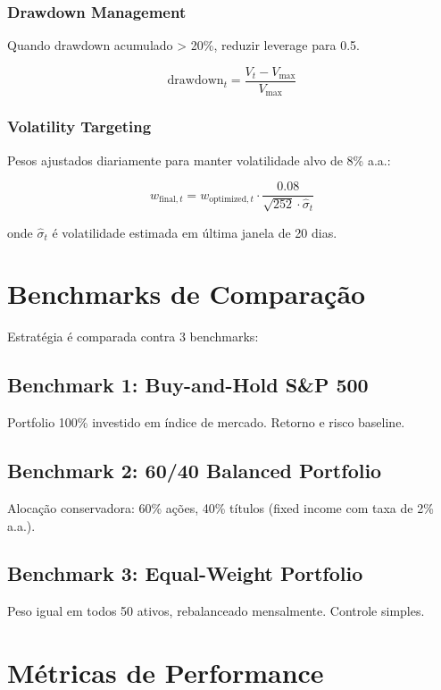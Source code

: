 \documentclass[12pt,a4paper]{article}
\begin{document}
\subsubsection{Drawdown Management}

Quando drawdown acumulado > 20\%, reduzir leverage para 0.5.

\[
\text{drawdown}_t = \frac{V_t - V_{\max}}{V_{\max}}
\]

\subsubsection{Volatility Targeting}

Pesos ajustados diariamente para manter volatilidade alvo de 8\% a.a.:

\[
w_{\text{final}, t} = w_{\text{optimized}, t} \cdot \frac{0.08}{\sqrt{252} \cdot \hat{\sigma}_t}
\]

onde $\hat{\sigma}_t$ é volatilidade estimada em última janela de 20 dias.

\section{Benchmarks de Comparação}

Estratégia é comparada contra 3 benchmarks:

\subsection{Benchmark 1: Buy-and-Hold S\&P 500}

Portfolio 100\% investido em índice de mercado. Retorno e risco baseline.

\subsection{Benchmark 2: 60/40 Balanced Portfolio}

Alocação conservadora: 60\% ações, 40\% títulos (fixed income com taxa de 2\% a.a.).

\subsection{Benchmark 3: Equal-Weight Portfolio}

Peso igual em todos 50 ativos, rebalanceado mensalmente. Controle simples.

\section{Métricas de Performance}
\end{document}

